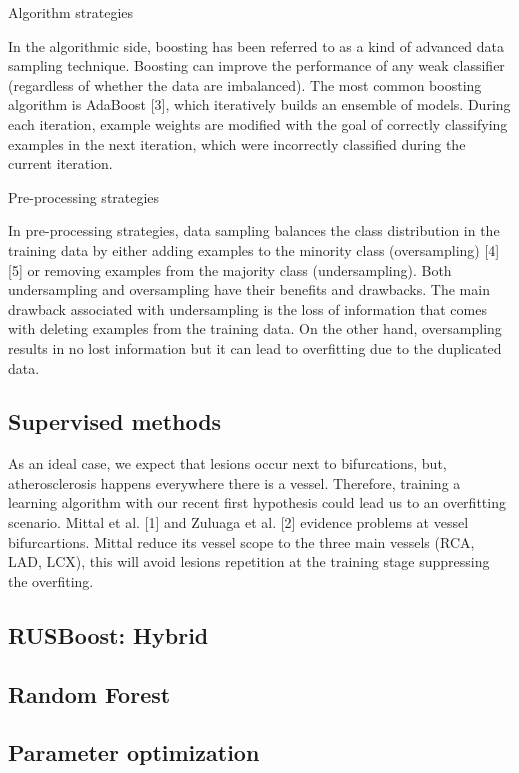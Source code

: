 Algorithm strategies

In the algorithmic side, boosting has been referred to as a kind of advanced data sampling technique. Boosting can improve the performance of any weak classifier (regardless of whether the data are imbalanced). The most common boosting algorithm is AdaBoost [3], which iteratively builds an ensemble of models. During each iteration, example weights are modified with the goal of correctly classifying examples in the next iteration, which were incorrectly classified during the current iteration.

Pre-processing strategies

In pre-processing strategies, data sampling balances the class distribution in the training data by either adding examples to the minority class (oversampling) [4][5] or removing examples from the majority class (undersampling). Both undersampling and oversampling have their benefits and drawbacks. The main drawback associated with undersampling is the loss of information that comes with deleting examples from the training data. On the other hand, oversampling results in no lost information but it can lead to overfitting due to the duplicated data.

\subsection{Supervised methods}


As an ideal case, we expect that lesions occur next to bifurcations, but, atherosclerosis happens everywhere there is a vessel. Therefore, training a learning algorithm with our recent first hypothesis could lead us to an overfitting scenario. Mittal et al. [1] and Zuluaga et al. [2] evidence problems at vessel bifurcartions. Mittal reduce its vessel scope to the three main vessels (RCA, LAD, LCX), this will avoid lesions repetition at the training stage suppressing the overfiting.

\subsection{RUSBoost: Hybrid}

\subsection{Random Forest}

\subsection{Parameter optimization}


